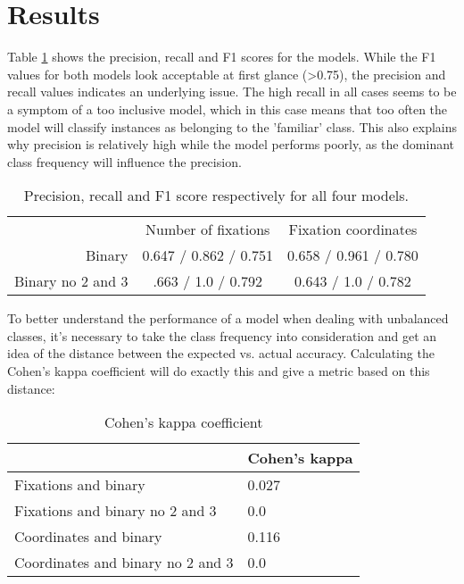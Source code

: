 \documentclass{llncs}
\begin{document}
\section{Results}
Table \ref{tab:results} shows the precision, recall and F1 scores for the models. While the F1 values for both models look acceptable at first glance (>0.75), the precision and recall values indicates an underlying issue. The high recall in all cases seems to be a symptom of a too inclusive model, which in this case means that too often the model will classify instances as belonging to the 'familiar' class. This also explains why precision is relatively high while the model performs poorly, as the dominant class frequency will influence the precision.

\begin{table}[htp]
\label{tab:results}
\centering
\caption{Precision, recall and F1 score respectively for all four models.}
\begin{tabular}{|r|c|c|}
\hline
 & Number of fixations & Fixation coordinates \\
Binary & 0.647 / 0.862 / 0.751 & 0.658 / 0.961 / 0.780 \\
Binary no  2 and 3 & .663 / 1.0 / 0.792 & 0.643 / 1.0 / 0.782 \\
\hline
\end{tabular}
\end{table}

To better understand the performance of a model when dealing with unbalanced classes, it's necessary to take the class frequency into consideration and get an idea of the distance between the expected vs. actual accuracy. Calculating the Cohen's kappa coefficient will do exactly this and give a metric based on this distance:

\begin{table}[htp]
\centering
\caption{Cohen's kappa coefficient}
\label{tab:kappa}
\begin{tabular}{|l|l|}
\hline
                      & Cohen's kappa \\ \hline
Fixations and binary  & 0.027         \\ \hline
Fixations and binary no 2 and 3 & 0.0 \\ \hline
Coordinates and binary & 0.116 \\ \hline
Coordinates and binary no 2 and 3 & 0.0 \\ \hline
\end{tabular}
\end{table}
\end{document}
